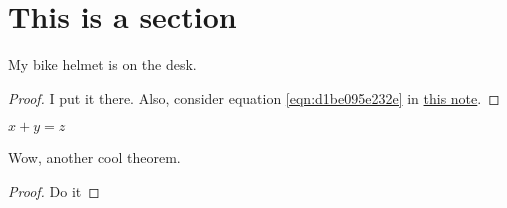 \documentclass[reqno]{amsart} 
\begin{document}
\section{This is a section}
\begin{theorem}
My bike helmet is on the desk.
\end{theorem}
\begin{proof}
I put it there.  Also, consider equation \eqref{eqn:d1be095e232e} in \href{20230614T131127__rings-of-differential-operators-blue-book-on-the-desk.pdf}{this note}.
\end{proof}

$x + y = z$

\begin{theorem}
  Wow, another cool theorem.
\end{theorem}
\begin{proof}
  Do it
\end{proof}



{} 
\end{document}
